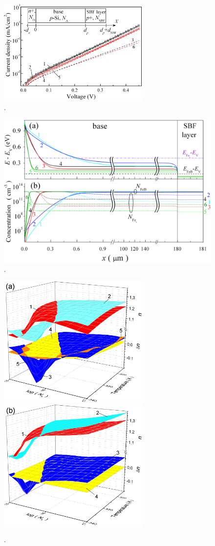 ﻿\documentclass[12pt]{article}
\begin{document}
\begin{figure}
\includegraphics[width=7.5cm]{FigIV}
\caption{.
}
\label{FigIV}
\end{figure}


\begin{figure}
\includegraphics[width=15cm]{FigEfAll}
\caption{.
}
\label{FigEf}
\end{figure}

\begin{figure}
\includegraphics[width=7.5cm]{FigFe100d24} \hfill
\includegraphics[width=7.5cm]{FigFe103d24}
\caption{.
}
\label{FigTNa}
\end{figure}
\end{document}
